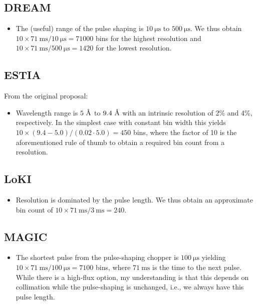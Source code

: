\documentclass[a4paper,english,numbers=noenddot,bibliography=totoc,chapterprefix=on,DIV=12]{scrartcl}
\newcommand{\angstrom}{\textup{\AA}}
\newcommand{\dream}{DREAM\xspace}
\newcommand{\estia}{ESTIA\xspace}
\newcommand{\loki}{LoKI\xspace}
\newcommand{\magic}{MAGIC\xspace}
\begin{document}
\subsection{\dream}

\begin{itemize}
  \item The (useful) range of the pulse shaping is $10~\mathrm{\mu s}$ to $500~\mathrm{\mu s}$.
    We thus obtain $10\times71~\mathrm{ms}/10~\mathrm{\mu s} = 71000$ bins for the highest resolution and $10\times71~\mathrm{ms}/500~\mathrm{\mu s} = 1420$ for the lowest resolution.
\end{itemize}

\subsection{\estia}

From the original proposal:

\begin{itemize}
  \item Wavelength range is $5~\angstrom$ to $9.4~\angstrom$ with an intrinsic resolution of 2\% and 4\%, respectively.
    In the simplest case with constant bin width this yields $10\times(9.4-5.0)/(0.02\cdot5.0) = 450$ bins, where the factor of 10 is the aforementioned rule of thumb to obtain a required bin count from a resolution.
\end{itemize}

\subsection{\loki}

\begin{itemize}
  \item Resolution is dominated by the pulse length.
    We thus obtain an approximate bin count of  $10\times71~\mathrm{ms}/3~\mathrm{ms} = 240$.
\end{itemize}

\subsection{\magic}

\begin{itemize}
  \item The shortest pulse from the pulse-shaping chopper is $100~\mathrm{\mu s}$ yielding $10\times71~\mathrm{ms}/100~\mathrm{\mu s} = 7100$ bins, where $71~\mathrm{ms}$ is the time to the next pulse.
    While there is a high-flux option, my understanding is that this depends on collimation while the pulse-shaping is unchanged, i.e., we always have this pulse length.
\end{itemize}
\end{document}
